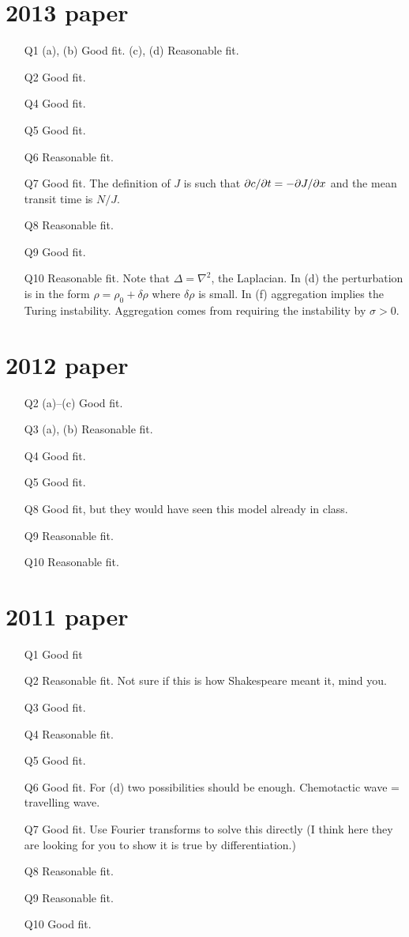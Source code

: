 \begin{multicols}{2}
\section*{2013 paper}
\begin{itemize}
\item[Q1] (a), (b) Good fit. (c), (d) Reasonable fit.
\item[Q2] Good fit.
\item[Q4] Good fit.
\item[Q5] Good fit. 
\item[Q6] Reasonable fit.
\item[Q7] Good fit. The definition of $J$ is such that $\pd{c}{t} = -\pd{J}{x}$ and the mean transit time is $N/J$.
\item[Q8] Reasonable fit.
\item[Q9] Good fit.
\item[Q10] Reasonable fit. Note that $\Delta = \nabla^2$, the Laplacian. In (d) the perturbation is in the form $\rho = \rho_0 + \delta \rho$ where $\delta \rho$ is small. In (f) aggregation implies the Turing instability. Aggregation comes from requiring the instability by $\sigma>0$.
\end{itemize}

\section*{2012 paper}
\begin{itemize}
\item[Q2] (a)--(c) Good fit.
\item[Q3] (a), (b) Reasonable fit.
\item[Q4] Good fit.
\item[Q5] Good fit. 
\item[Q8] Good fit, but they would have seen this model already in class.
\item[Q9] Reasonable fit.
\item[Q10] Reasonable fit.
\end{itemize}

\section*{2011 paper}
\begin{itemize}
\item[Q1] Good fit
\item[Q2] Reasonable fit. Not sure if this is how Shakespeare meant it, mind you.
\item[Q3] Good fit. 
\item[Q4] Reasonable fit.
\item[Q5] Good fit.
\item[Q6] Good fit. For (d) two possibilities should be enough. Chemotactic wave = travelling wave.
\item[Q7] Good fit. Use Fourier transforms to solve this directly (I think here they are looking for you to show it is true by differentiation.)
\item[Q8] Reasonable fit.
\item[Q9] Reasonable fit.
\item[Q10] Good fit.
\end{itemize}

\end{multicols}
%

